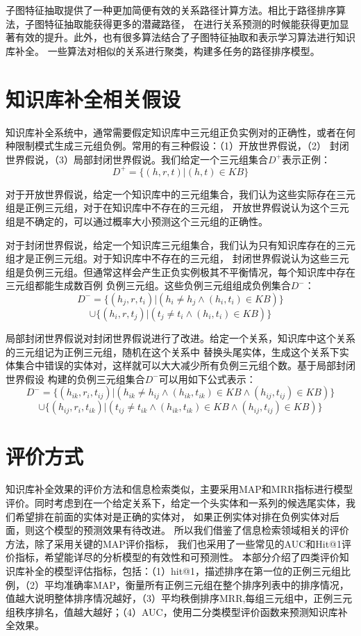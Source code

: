 子图特征抽取\cite{Gardner2015}提供了一种更加简便有效的关系路径计算方法。相比于路径排序算法，子图特征抽取能获得更多的潜藏路径，
在进行关系预测的时候能获得更加显著有效的提升。此外，也有很多算法结合了子图特征抽取和表示学习算法\cite{Gardner2014}进行知识库补全。
一些算法对相似的关系进行聚类，构建多任务的路径排序模型\cite{Wang2016}。


\section{知识库补全相关假设}
知识库补全系统中，通常需要假定知识库中三元组正负实例对的正确性，或者在何种限制模式生成三元组负例。常用的有三种假设：（1）开放世界假说，（2）
封闭世界假说，（3）局部封闭世界假说。我们给定一个三元组集合$D^+$表示正例：
$$D^+=\{(h,r,t)|(h,t) \in KB\}$$

对于开放世界假说，给定一个知识库中的三元组集合，我们认为这些实际存在三元组是正例三元组，对于在知识库中不存在的三元组，
开放世界假说认为这个三元组是不确定的，可以通过概率大小预测这个三元组的正确性。

对于封闭世界假说，给定一个知识库三元组集合，我们认为只有知识库存在的三元组才是正例三元组。对于知识库中不存在的三元组，
封闭世界假说认为这些三元组是负例三元组。但通常这样会产生正负实例极其不平衡情况，每个知识库中存在三元组都能生成数百例
负例三元组。这些负例三元组组成负例集合$D^-$：
$$D^-=\{(h_j,r,t_i)|(h_i \ne h_j \wedge (h_i,t_i) \in KB)\}$$
$$ \cup \{(h_i,r,t_j)|(t_j \ne t_i \wedge(h_i,t_i) \in KB)\}$$

局部封闭世界假说对封闭世界假说进行了改进。给定一个关系，知识库中这个关系的三元组记为正例三元组，随机在这个关系中
替换头尾实体，生成这个关系下实体集合中错误的实体对，这样就可以大大减少所有负例三元组个数。基于局部封闭世界假设
构建的负例三元组集合$D^-$可以用如下公式表示：
$$D^-=\{(h_{ik},r_i,t_{ij})|(h_{ik} \ne h_{ij} \wedge (h_{ik},t_{ik}) \in KB  \wedge (h_{ij},t_{ij}) \in KB)\}$$
$$ \cup \{(h_{ij},r_i,t_{ik})|(t_{ij} \ne t_{ik} \wedge(h_{ik},t_{ik}) \in KB \wedge(h_{ij},t_{ij}) \in KB)\}$$

\section{评价方式}
\label{sec:metrics}
知识库补全效果的评价方法和信息检索类似，主要采用MAP和MRR\cite{Gardner2014}指标进行模型评价。同时考虑到在一个给定关系下，给定一个头实体和一系列的候选尾实体，我们希望排在前面的实体对是正确的实体对，
如果正例实体对排在负例实体对后面，则这个模型的预测效果有待改进。
所以我们借鉴了信息检索领域相关的评价方法，除了采用关键的MAP评价指标，
我们也采用了一些常见的AUC和Hit@1评价指标，希望能详尽的分析模型的有效性和可预测性。
本部分介绍了四类评价知识库补全的模型评估指标，包括：（1）hit@1，描述排序在第一位的正例三元组比例，（2）平均准确率MAP，衡量所有正例三元组在整个排序列表中的排序情况，值越大说明整体排序情况越好，（3）平均秩倒排序MRR,每组三元组中，正例三元组秩序排名，值越大越好；（4）AUC，使用二分类模型评价函数来预测知识库补全效果。

